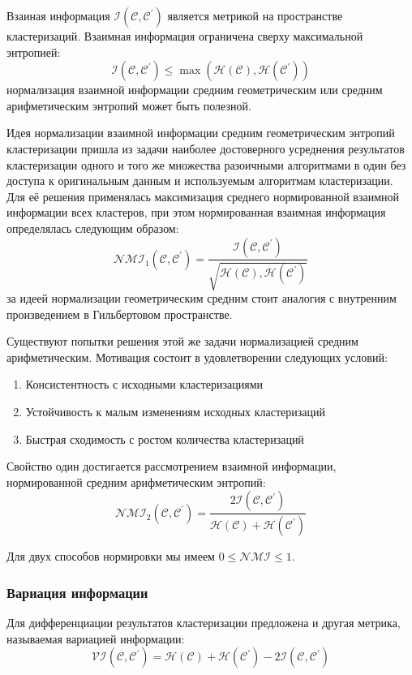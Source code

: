 Взаиная информация $\mathcal{I}(\mathcal{C}, \mathcal{C}^\prime)$ является метрикой на пространстве кластеризаций.  Взаимная информация ограничена сверху максимальной энтропией:
\begin{equation}
	\mathcal{I}(\mathcal{C}, \mathcal{C}^\prime) \leq \max(\mathcal{H}(\mathcal{C}),\mathcal{H}(\mathcal{C}^\prime))
\end{equation}
нормализация взаимной информации средним геометрическим или средним арифметическим энтропий может быть полезной. 

Идея нормализации взаимной информации средним геометрическим энтропий кластеризации пришла из задачи наиболее достоверного усреднения результатов кластеризации одного и того же множества разоичными алгоритмами в один без доступа к оригинальным данным и используемым алгоритмам кластеризации. Для её решения применялась максимизация среднего нормированной взаимной информации всех кластеров, при этом нормированная взаимная информация определялась следующим образом:
\begin{equation}
	\mathcal{NMI}_1(\mathcal{C,C}^\prime) = \frac{\mathcal{I(C,C^\prime)}}{\sqrt{\mathcal{H(C),H(C^\prime)}}}
\end{equation}
за идеей нормализации геометрическим средним стоит аналогия с внутренним произведением в Гильбертовом пространстве. 

Существуют попытки решения этой же задачи нормализацией средним арифметическим. Мотивация состоит в удовлетворении следующих условий:
\begin{enumerate}
	\item Консистентность с исходными кластеризациями
	\item Устойчивость к малым изменениям исходных кластеризаций
	\item Быстрая сходимость с ростом количества кластеризаций
\end{enumerate}
Свойство один достигается рассмотрением взаимной информации, нормированной средним арифметическим энтропий:
\begin{equation}
	\mathcal{NMI}_2(\mathcal{C,C}^\prime) = \frac{2\mathcal{I(C,C^\prime)}}{\mathcal{H(C)+H(C^\prime)}}
\end{equation}

Для двух способов нормировки мы имеем $0 \leq \mathcal{NMI} \leq 1$.

\subsubsection{Вариация информации}
Для дифференциации результатов кластеризации предложена и другая метрика, называемая вариацией информации:
\begin{equation}
	\mathcal{VI(C,C^\prime)} = \mathcal{H(C) + H(C^\prime)} - 2\mathcal{ I(C,C^\prime)}
\end{equation}

